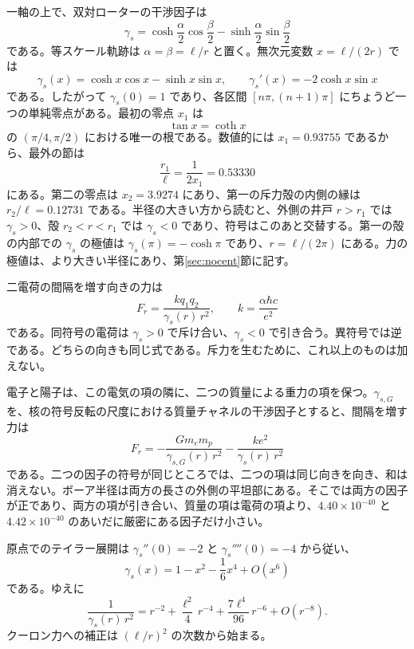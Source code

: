 \documentclass[a4paper]{article}
\begin{document}
一軸の上で、双対ローターの干渉因子は
\[
\gamma_s
  =\cosh\frac{\alpha}{2}\cos\frac{\beta}{2}
  -\sinh\frac{\alpha}{2}\sin\frac{\beta}{2}
\]
である。等スケール軌跡は \(\alpha=\beta=\ell/r\) と置く。無次元変数 \(x=\ell/(2r)\) では
\begin{equation}
\label{eq:gamma}
\gamma_s(x)=\cosh x\cos x-\sinh x\sin x,
\qquad
\gamma_s'(x)=-2\cosh x\sin x
\end{equation}
である。したがって \(\gamma_s(0)=1\) であり、各区間 \([n\pi,(n+1)\pi]\) にちょうど一つの単純零点がある。最初の零点 \(x_1\) は
\begin{equation}
\label{eq:node}
\tan x=\coth x
\end{equation}
の \((\pi/4,\pi/2)\) における唯一の根である。数値的には \(x_1=0.93755\) であるから、最外の節は
\[
\frac{r_1}{\ell}=\frac{1}{2x_1}=0.53330
\]
にある。第二の零点は \(x_2=3.9274\) にあり、第一の斥力殻の内側の縁は \(r_2/\ell=0.12731\) である。半径の大きい方から読むと、外側の井戸 \(r>r_1\) では \(\gamma_s>0\)、殻 \(r_2<r<r_1\) では \(\gamma_s<0\) であり、符号はこのあと交替する。第一の殻の内部での \(\gamma_s\) の極値は \(\gamma_s(\pi)=-\cosh\pi\) であり、\(r=\ell/(2\pi)\) にある。力の極値は、より大きい半径にあり、第\ref{sec:nocent}節に記す。

二電荷の間隔を増す向きの力は
\begin{equation}
\label{eq:force}
F_r=\frac{k q_1 q_2}{\gamma_s(r)\,r^{2}},
\qquad
k=\frac{\alpha\hbar c}{e^{2}}
\end{equation}
である。同符号の電荷は \(\gamma_s>0\) で斥け合い、\(\gamma_s<0\) で引き合う。異符号では逆である。どちらの向きも同じ式である。斥力を生むために、これ以上のものは加えない。

電子と陽子は、この電気の項の隣に、二つの質量による重力の項を保つ。\(\gamma_{s,G}\) を、核の符号反転の尺度における質量チャネルの干渉因子とすると、間隔を増す力は
\begin{equation}
\label{eq:both}
F_r
  =-\frac{G m_e m_p}{\gamma_{s,G}(r)\,r^{2}}
  -\frac{k e^{2}}{\gamma_s(r)\,r^{2}}
\end{equation}
である。二つの因子の符号が同じところでは、二つの項は同じ向きを向き、和は消えない。ボーア半径は両方の長さの外側の平坦部にある。そこでは両方の因子が正であり、両方の項が引き合い、質量の項は電荷の項より、\(4.40\times 10^{-40}\) と \(4.42\times 10^{-40}\) のあいだに厳密にある因子だけ小さい。

原点でのテイラー展開は \(\gamma_s''(0)=-2\) と \(\gamma_s''''(0)=-4\) から従い、
\begin{equation}
\label{eq:series}
\gamma_s(x)=1-x^{2}-\frac16 x^{4}+O(x^{6})
\end{equation}
である。ゆえに
\[
\frac{1}{\gamma_s(r)\,r^{2}}
  =r^{-2}+\frac{\ell^{2}}{4}\,r^{-4}+\frac{7\ell^{4}}{96}\,r^{-6}+O(r^{-8}).
\]
クーロン力への補正は \((\ell/r)^{2}\) の次数から始まる。
\end{document}
